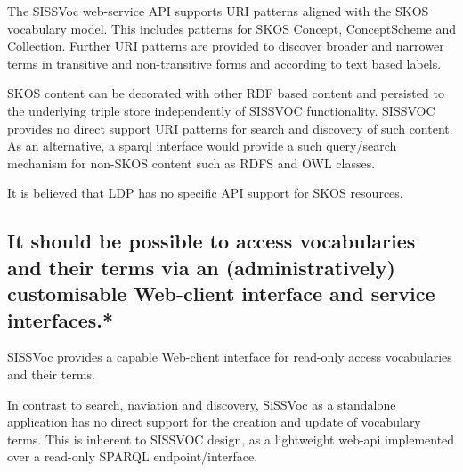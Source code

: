\documentclass[10pt,a4paper]{article}
\begin{document}
\begin{flushleft}
  The SISSVoc web-service API supports URI patterns aligned with the SKOS
vocabulary model. This includes patterns for SKOS Concept,
ConceptScheme and Collection. Further URI patterns are provided to discover
broader and narrower terms in transitive and non-transitive forms and according
to text based labels. 

  SKOS content can be decorated with other RDF based
content and persisted to the underlying triple store independently of SISSVOC
functionality. SISSVOC provides
no direct support URI patterns for search and discovery of such content. As an
alternative, a sparql interface would provide a
such query/search mechanism for non-SKOS content such as RDFS and OWL classes. 

It is believed that LDP has no specific API support for SKOS resources.

% 
% 
% 

  \subsection{
  It should be possible to access vocabularies and their terms via an 
  (administratively) customisable Web-client interface and service interfaces.* } 


  SISSVoc provides a capable Web-client interface for read-only access vocabularies and their terms.

  In contrast to search, naviation and discovery, SiSSVoc as a standalone application has no direct 
  support for the creation and update of vocabulary terms. This is inherent to SISSVOC design, as a 
  lightweight web-api implemented over a read-only SPARQL endpoint/interface.  


\end{flushleft}
\end{document}
